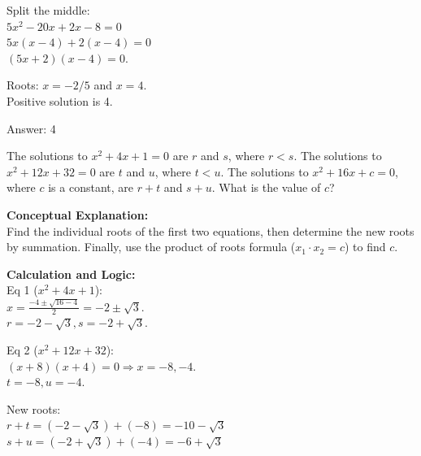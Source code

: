 \documentclass[11pt,paper=a4,answers]{exam}
\begin{document}
\begin{questions}
\begin{solution}
Split the middle: \\
$5x^2 - 20x + 2x - 8 = 0$ \\
$5x(x - 4) + 2(x - 4) = 0$ \\
$(5x + 2)(x - 4) = 0$.

\vspace{10pt}

Roots: $x = -2/5$ and $x = 4$. \\
Positive solution is 4.

\vspace{25pt}

Answer: \colorbox{yellow!100}{4}
\end{solution}

\vspace{40pt}

\question
The solutions to $x^2 + 4x + 1 = 0$ are $r$ and $s$, where $r < s$. The solutions to $x^2 + 12x + 32 = 0$ are $t$ and $u$, where $t < u$. The solutions to $x^2 + 16x + c = 0$, where $c$ is a constant, are $r+t$ and $s+u$. What is the value of $c$?

\begin{solution}
\textbf{Conceptual Explanation:} \\
Find the individual roots of the first two equations, then determine the new roots by summation. Finally, use the product of roots formula ($x_1 \cdot x_2 = c$) to find $c$.

\vspace{20pt}

\textbf{Calculation and Logic:} \\
Eq 1 ($x^2 + 4x + 1$): \\
$x = \frac{-4 \pm \sqrt{16-4}}{2} = -2 \pm \sqrt{3}$. \\
$r = -2-\sqrt{3}, s = -2+\sqrt{3}$.

\vspace{10pt}

Eq 2 ($x^2 + 12x + 32$): \\
$(x+8)(x+4)=0 \Rightarrow x = -8, -4$. \\
$t = -8, u = -4$.

\vspace{10pt}

New roots: \\
$r+t = (-2-\sqrt{3}) + (-8) = -10-\sqrt{3}$ \\
$s+u = (-2+\sqrt{3}) + (-4) = -6+\sqrt{3}$

\vspace{10pt}


\end{solution}
\end{questions}
\end{document}
